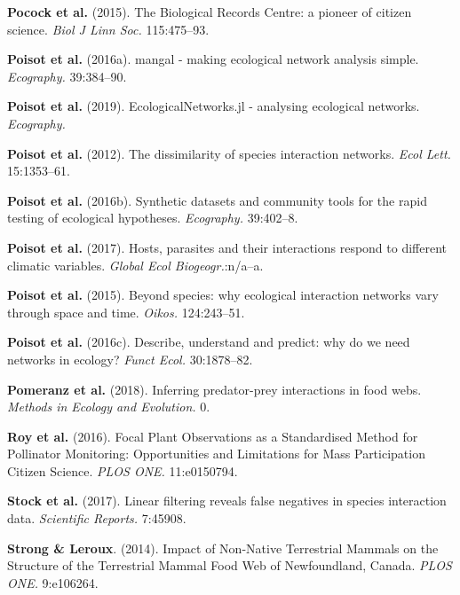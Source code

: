 \leavevmode\hypertarget{ref-PocoRoy15}{}%
\textbf{Pocock et al.} (2015). The Biological Records Centre: a pioneer
of citizen science. \emph{Biol J Linn Soc.} 115:475--93.

\leavevmode\hypertarget{ref-PoisBais16}{}%
\textbf{Poisot et al.} (2016a). mangal - making ecological network
analysis simple. \emph{Ecography.} 39:384--90.

\leavevmode\hypertarget{ref-PoisBeli19}{}%
\textbf{Poisot et al.} (2019). EcologicalNetworks.jl - analysing
ecological networks. \emph{Ecography.}

\leavevmode\hypertarget{ref-PoisCana12}{}%
\textbf{Poisot et al.} (2012). The dissimilarity of species interaction
networks. \emph{Ecol Lett.} 15:1353--61.

\leavevmode\hypertarget{ref-PoisGrav16}{}%
\textbf{Poisot et al.} (2016b). Synthetic datasets and community tools
for the rapid testing of ecological hypotheses. \emph{Ecography.}
39:402--8.

\leavevmode\hypertarget{ref-PoisGuev17}{}%
\textbf{Poisot et al.} (2017). Hosts, parasites and their interactions
respond to different climatic variables. \emph{Global Ecol
Biogeogr.}:n/a--a.

\leavevmode\hypertarget{ref-PoisStou15}{}%
\textbf{Poisot et al.} (2015). Beyond species: why ecological
interaction networks vary through space and time. \emph{Oikos.}
124:243--51.

\leavevmode\hypertarget{ref-PoisStou16}{}%
\textbf{Poisot et al.} (2016c). Describe, understand and predict: why do
we need networks in ecology? \emph{Funct Ecol.} 30:1878--82.

\leavevmode\hypertarget{ref-PomeThom18}{}%
\textbf{Pomeranz et al.} (2018). Inferring predator-prey interactions in
food webs. \emph{Methods in Ecology and Evolution.} 0.

\leavevmode\hypertarget{ref-RoyBaxt16}{}%
\textbf{Roy et al.} (2016). Focal Plant Observations as a Standardised
Method for Pollinator Monitoring: Opportunities and Limitations for Mass
Participation Citizen Science. \emph{PLOS ONE.} 11:e0150794.

\leavevmode\hypertarget{ref-StocPois17}{}%
\textbf{Stock et al.} (2017). Linear filtering reveals false negatives
in species interaction data. \emph{Scientific Reports.} 7:45908.

\leavevmode\hypertarget{ref-StroLero14}{}%
\textbf{Strong \& Leroux}. (2014). Impact of Non-Native Terrestrial
Mammals on the Structure of the Terrestrial Mammal Food Web of
Newfoundland, Canada. \emph{PLOS ONE.} 9:e106264.

